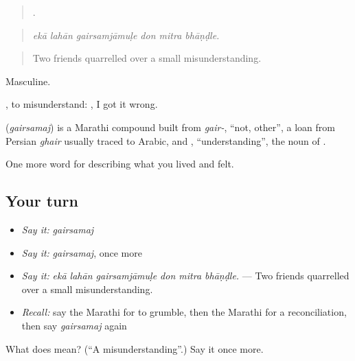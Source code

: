 \begin{quote}
     .
\end{quote}

\begin{quote}
\emph{ekā lahān gairsamjāmuḷe don mitra bhāṇḍle.}
\end{quote}

\begin{quote}
Two friends quarrelled over a small misunderstanding.
\end{quote}

Masculine.

 , to misunderstand:   , I got it wrong.

\begin{cousinweb}
\textbf{} (\emph{gairsamaj}) is a Marathi compound built from \emph{gair-}, \textquotedblleft{}not, other\textquotedblright{}, a loan from Persian \emph{ghair} usually traced to Arabic, and , \textquotedblleft{}understanding\textquotedblright{}, the noun of .
\end{cousinweb}

\begin{grammarlens}[title={What you've built}]
One more word for describing what you lived and felt.
\end{grammarlens}

\subsection*{Your turn}
\begin{itemize}
\raggedright
  \item \emph{Say it:} \emph{gairsamaj}
  \item \emph{Say it:} \emph{gairsamaj}, once more
  \item \emph{Say it:} \emph{ekā lahān gairsamjāmuḷe don mitra bhāṇḍle.} — Two friends quarrelled over a small misunderstanding.
  \item \emph{Recall:} say the Marathi for to grumble, then the Marathi for a reconciliation, then say \emph{gairsamaj} again
\end{itemize}

\begin{tcolorbox}[breakable,colback=teal!4,colframe=teal!35!black,title={Before you move on}]
What does  mean? (\textquotedblleft{}A misunderstanding\textquotedblright{}.) Say it once more.
\end{tcolorbox}
